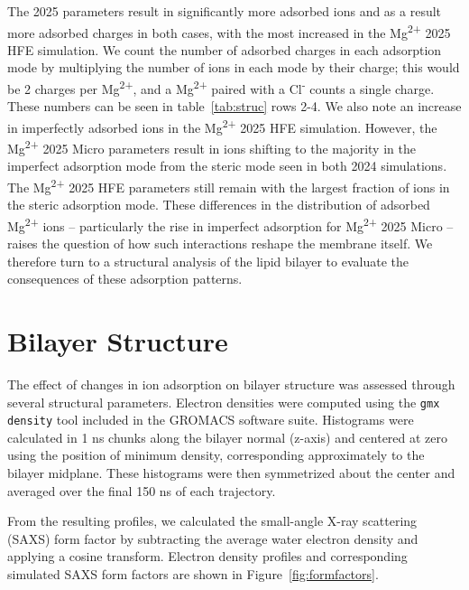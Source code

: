 \documentclass[journal=langd5,manuscript=article]{achemso}
\newcommand{\mg}{Mg\textsuperscript{2+}}
\newcommand{\cl}{Cl\textsuperscript{-}}
\begin{document}
The 2025 parameters result in significantly more adsorbed ions and as a result more adsorbed charges in both cases, with the most increased in the \mg{ 2025} HFE simulation.
We count the number of adsorbed charges in each adsorption mode by multiplying the number of ions in each mode by their charge; this would be 2 charges per \mg{}, and a \mg{} paired with a \cl{}
counts a single charge. 
These numbers can be seen in table~\ref{tab:struc} rows 2-4.
We also note an increase in imperfectly adsorbed ions in the \mg{ 2025} HFE simulation. However, the \mg{ 2025} Micro parameters result in ions shifting to the majority in the imperfect
adsorption mode from the steric mode seen in both 2024 simulations.
The \mg{ 2025} HFE parameters still remain with the largest fraction of ions in the steric adsorption mode. 
These differences in the distribution of adsorbed \mg{} ions -- particularly the rise in imperfect adsorption for \mg{ 2025} Micro -- 
raises the question of how such interactions reshape the membrane itself. We therefore turn to a structural analysis of the lipid bilayer 
to evaluate the consequences of these adsorption patterns.


\section{Bilayer Structure}
The effect of changes in ion adsorption on bilayer structure was assessed through several structural parameters. Electron densities were
computed using the \texttt{gmx density} tool included in the GROMACS software suite. Histograms were calculated in 1 ns chunks along the
bilayer normal (z-axis) and centered at zero using the position of minimum density, corresponding approximately to the bilayer midplane.
These histograms were then symmetrized about the center and averaged over the final 150 ns of each trajectory.

From the resulting profiles, we calculated the small-angle X-ray scattering (SAXS) form factor by subtracting the average water electron
density and applying a cosine transform. Electron density profiles and corresponding simulated SAXS form factors are shown in
Figure~\ref{fig:formfactors}.
\end{document}
